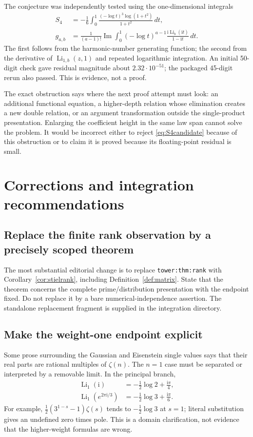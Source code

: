 \documentclass[11pt]{article}
\numberwithin{equation}{section}
\theoremstyle{definition}\newtheorem{definition}[theorem]{Definition}
\theoremstyle{remark}\newtheorem{remark}[theorem]{Remark}
\DeclareMathOperator{\Li}{Li}
\DeclareMathOperator{\Ima}{Im}
\newcommand{\ii}{\mathrm i}
\newcommand{\code}[1]{\texttt{\small #1}}
\begin{document}
The conjecture was independently tested using the one-dimensional integrals
\begin{align}\label{eq:S4int}
S_4&=-\frac16\int_0^1\frac{(-\log t)^3\log(1+t^2)}{1+t^2}\,dt,\\
g_{a,b}&=\frac1{(a-1)!}\Ima\int_0^1
(-\log t)^{a-1}\frac{\ii\Li_b(\ii t)}{1-\ii t}\,dt.
\end{align}
The first follows from the harmonic-number generating function; the second
from the derivative of $\Li_{1,b}(z,1)$ and repeated logarithmic
integration. An initial 50-digit check gave residual magnitude about
$2.32\cdot10^{-51}$; the packaged 45-digit rerun also passed.
This is evidence, not a proof.

The exact obstruction says where the next proof attempt must look: an
additional functional equation, a higher-depth relation whose elimination
creates a new double relation, or an argument transformation outside the
single-product presentation. Enlarging the coefficient height in the same
law span cannot solve the problem. It would be incorrect either to reject
\eqref{eq:S4candidate} because of this obstruction or to claim it is proved
because its floating-point residual is small.

\section{Corrections and integration recommendations}

\subsection{Replace the finite rank observation by a precisely scoped theorem}

The most substantial editorial change is to replace
\code{tower:thm:rank} with Corollary~\ref{cor:stielrank}, including
Definition~\ref{def:matrix}. State that the theorem concerns the complete
prime/distribution presentation with the endpoint fixed. Do not replace it
by a bare numerical-independence assertion. The standalone replacement
fragment is supplied in the integration directory.

\subsection{Make the weight-one endpoint explicit}

Some prose surrounding the Gaussian and Eisenstein single values says that
their real parts are rational multiples of $\zeta(n)$. The $n=1$ case must
be separated or interpreted by a removable limit. In the principal branch,
\begin{align}\label{eq:Li1}
\Li_1(\ii)&=-\tfrac12\log2+\tfrac{\ii\pi}{4},\\
\Li_1(e^{2\pi\ii/3})&=-\tfrac12\log3+\tfrac{\ii\pi}{6}.
\end{align}
For example, $\tfrac12(3^{1-s}-1)\zeta(s)$ tends to
$-\tfrac12\log3$ at $s=1$; literal substitution gives an undefined
zero times pole. This is a domain clarification, not evidence that the
higher-weight formulas are wrong.
\end{document}
